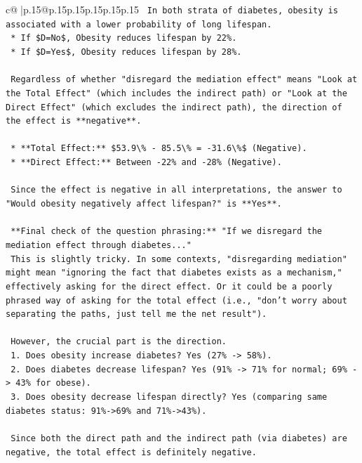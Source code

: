 \documentclass{article}
\begin{document}
{\begin{supertabular}{c@{$\;$}|p{.15\linewidth}@{}p{.15\linewidth}p{.15\linewidth}p{.15\linewidth}p{.15\linewidth}p{.15\linewidth}}
{{{\texttt{    In both strata of diabetes, obesity is associated with a lower probability of long lifespan.} \\
\texttt{    *   If \$D=No\$, Obesity reduces lifespan by 22\%.} \\
\texttt{    *   If \$D=Yes\$, Obesity reduces lifespan by 28\%.} \\
\\ 
\texttt{    Regardless of whether "disregard the mediation effect" means "Look at the Total Effect" (which includes the indirect path) or "Look at the Direct Effect" (which excludes the indirect path), the direction of the effect is **negative**.} \\
\\ 
\texttt{    *   **Total Effect:** \$53.9\textbackslash{}\% {-} 85.5\textbackslash{}\% = {-}31.6\textbackslash{}\%\$ (Negative).} \\
\texttt{    *   **Direct Effect:** Between {-}22\% and {-}28\% (Negative).} \\
\\ 
\texttt{    Since the effect is negative in all interpretations, the answer to "Would obesity negatively affect lifespan?" is **Yes**.} \\
\\ 
\texttt{    **Final check of the question phrasing:** "If we disregard the mediation effect through diabetes..."} \\
\texttt{    This is slightly tricky. In some contexts, "disregarding mediation" might mean "ignoring the fact that diabetes exists as a mechanism," effectively asking for the direct effect. Or it could be a poorly phrased way of asking for the total effect (i.e., "don't worry about separating the paths, just tell me the net result").} \\
\\ 
\texttt{    However, the crucial part is the direction.} \\
\texttt{    1.  Does obesity increase diabetes? Yes (27\% {-}> 58\%).} \\
\texttt{    2.  Does diabetes decrease lifespan? Yes (91\% {-}> 71\% for normal; 69\% {-}> 43\% for obese).} \\
\texttt{    3.  Does obesity decrease lifespan directly? Yes (comparing same diabetes status: 91\%{-}>69\% and 71\%{-}>43\%).} \\
\\ 
\texttt{    Since both the direct path and the indirect path (via diabetes) are negative, the total effect is definitely negative.} \\
}}}
\end{supertabular}}
\end{document}
